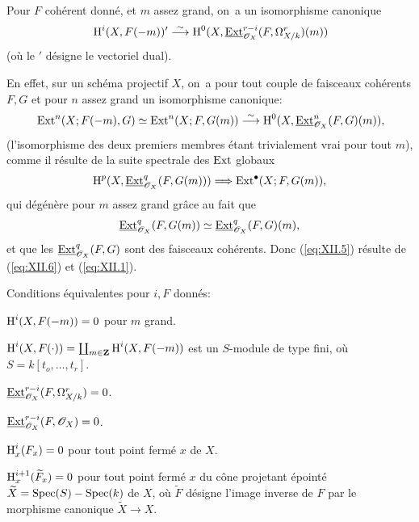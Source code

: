 \begin{corollaire} \label{XII.1.2} Pour $F$ coh\'erent donn\'e, et $m$ assez grand, on~a un isomorphisme canonique
\steco
\begin{equation} \label{eq:XII.5} {}\operatorname{H}^i(X, F(-m))'\overset{\sim}{\longrightarrow}\operatorname{H}^0(X, \mathop{\underline{\mathrm{Ext}}}\nolimits_{\mathscr{O}_X}^{r-i}(F, \Omega_{X/k}^r)(m))
\end{equation}
(o\`u le $'$ d\'esigne le vectoriel dual).
\end{corollaire}
En effet, sur un sch\'ema projectif $X$, on~a pour tout couple de faisceaux coh\'erents $F, G$ et pour $n$ assez grand un isomorphisme canonique:
\steco
\begin{equation} \label{eq:XII.6} {}\operatorname{Ext}^n(X;F(-m), G)\simeq \operatorname{Ext}^n(X;F, G(m)) \overset{\sim}{\longrightarrow} \operatorname{H}^0(X, \mathop{\underline{\mathrm{Ext}}}\nolimits_{\mathscr{O}_X}^{n}(F, G)(m)),
\end{equation}
(l'isomorphisme des deux premiers membres \'etant trivialement vrai pour tout $m$), comme il r\'esulte de la suite spectrale des $\operatorname{Ext}$ globaux
\[
\H^p(X, \mathop{\underline{\mathrm{Ext}}}\nolimits^q_{\OX}(F, G(m))) \To \Ext^{\bullet}(X;F, G(m)),
\]
qui d\'eg\'en\`ere pour $m$ assez grand gr\^ace au fait que
\[
\mathop{\underline{\mathrm{Ext}}}\nolimits^q_{\mathscr{O}_X}(F, G(m)) \simeq \mathop{\underline{\mathrm{Ext}}}\nolimits^q_{\mathscr{O}_X}(F, G)(m),
\]
et que les $\mathop{\underline{\mathrm{Ext}}}\nolimits^q_{\mathscr{O}_X}(F, G)$ sont des faisceaux coh\'erents. Donc (\ref{eq:XII.5}) r\'esulte de (\ref{eq:XII.6}) et (\ref{eq:XII.1}).

\begin{corollaire} \label{XII.1.3}
Conditions \'equivalentes pour $i, F$ donn\'es:
\begin{enumeratei}
\item
$\operatorname{H}^i(X, F(-m))=0$ pour $m$ grand.
\item[\textup{(i bis)}] $\operatorname{H}^i(X, F(\cdot))= \coprod_{m\in\mathbf{Z}}\operatorname{H}^i(X, F(-m))$ est un $S$-module de type fini, o\`u $S=k[t_o, \ldots, t_r]$.
\item
$\mathop{\underline{\mathrm{Ext}}}\nolimits^{r-i}_{\mathscr{O}_X}(F, \Omega_{X/k}^r)=0$.
\item[\textup{(ii bis)}] $\mathop{\underline{\mathrm{Ext}}}\nolimits^{r-i}_{\mathscr{O}_X}(F, \mathscr{O}_X)=0$.
\item
$\operatorname{H}^i_x(F_x)=0$ pour tout point ferm\'e $x$ de $X$.
\item
$\operatorname{H}^{i+1}_x(\widetilde{F}_x)=0$ pour tout point ferm\'e $x$ du c\^{o}ne projetant \'epoint\'e $\widetilde{X}=\operatorname{Spec}(S)-\operatorname{Spec}(k)$ de $X$, o\`u $\widetilde{F}$ d\'esigne l'image inverse de $F$ par le morphisme canonique $\widetilde{X}\to X$.
\end{enumeratei}
\end{corollaire}

